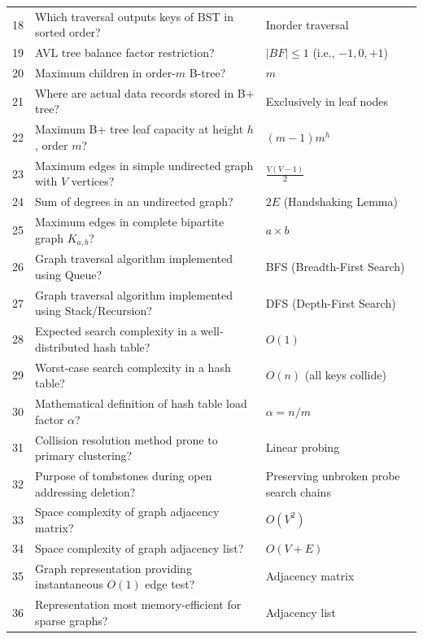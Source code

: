 \begin{longtable}{r p{9.2cm} p{6.0cm}}
18 & Which traversal outputs keys of BST in sorted order? & Inorder traversal \\
19 & AVL tree balance factor restriction? & $|BF| \leq 1$ (i.e., $-1, 0, +1$) \\
20 & Maximum children in order-$m$ B-tree? & $m$ \\
21 & Where are actual data records stored in B+ tree? & Exclusively in leaf nodes \\
22 & Maximum B+ tree leaf capacity at height $h$, order $m$? & $(m-1)m^h$ \\
23 & Maximum edges in simple undirected graph with $V$ vertices? & $\frac{V(V-1)}{2}$ \\
24 & Sum of degrees in an undirected graph? & $2E$ (Handshaking Lemma) \\
25 & Maximum edges in complete bipartite graph $K_{a,b}$? & $a \times b$ \\
26 & Graph traversal algorithm implemented using Queue? & BFS (Breadth-First Search) \\
27 & Graph traversal algorithm implemented using Stack/Recursion? & DFS (Depth-First Search) \\
28 & Expected search complexity in a well-distributed hash table? & $O(1)$ \\
29 & Worst-case search complexity in a hash table? & $O(n)$ (all keys collide) \\
30 & Mathematical definition of hash table load factor $\alpha$? & $\alpha = n / m$ \\
31 & Collision resolution method prone to primary clustering? & Linear probing \\
32 & Purpose of tombstones during open addressing deletion? & Preserving unbroken probe search chains \\
33 & Space complexity of graph adjacency matrix? & $O(V^2)$ \\
34 & Space complexity of graph adjacency list? & $O(V + E)$ \\
35 & Graph representation providing instantaneous $O(1)$ edge test? & Adjacency matrix \\
36 & Representation most memory-efficient for sparse graphs? & Adjacency list \\
\end{longtable}
